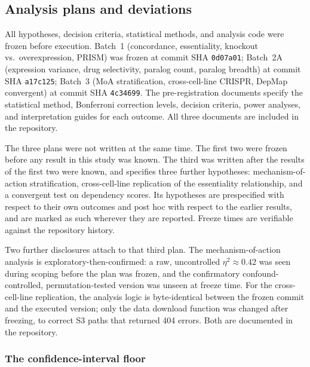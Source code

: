 \documentclass[11pt]{article}
\begin{document}
\subsection*{Analysis plans and deviations}
\label{sec:integrity}

All hypotheses, decision criteria, statistical methods, and analysis
code were frozen before execution.  Batch~1
(concordance, essentiality, knockout vs.\ overexpression, PRISM) was
frozen at commit SHA \texttt{0d07a01}; Batch~2A (expression variance,
drug selectivity, paralog count, paralog breadth) at commit SHA
\texttt{a17c125}; Batch~3 (MoA stratification, cross-cell-line CRISPR,
DepMap convergent) at commit SHA \texttt{4c34699}.  The pre-registration
documents specify the statistical method, Bonferroni correction levels,
decision criteria, power analyses, and interpretation guides for each
outcome.  All three documents are included in the repository.

The three plans were not written at the same time.  The first two were frozen
before any result in this study was known.  The third was written after the
results of the first two were known, and specifies three further hypotheses:
mechanism-of-action stratification, cross-cell-line replication of the
essentiality relationship, and a convergent test on dependency scores.  Its
hypotheses are prespecified with respect to their own outcomes and post hoc
with respect to the earlier results, and are marked as such wherever they are
reported.  Freeze times are verifiable against the repository history.

Two further disclosures attach to that third plan.  The mechanism-of-action
analysis is exploratory-then-confirmed: a raw, uncontrolled $\eta^2 \approx
0.42$ was seen during scoping before the plan was frozen, and the confirmatory
confound-controlled, permutation-tested version was unseen at freeze time.  For
the cross-cell-line replication, the analysis logic is byte-identical between
the frozen commit and the executed version; only the data download function was
changed after freezing, to correct S3 paths that returned 404 errors.  Both are
documented in the repository.

\subsubsection*{The confidence-interval floor}
\end{document}
